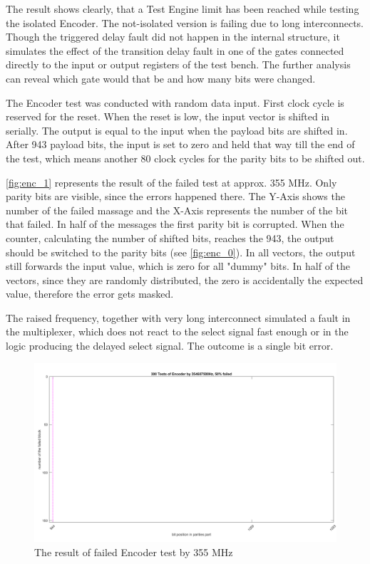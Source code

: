 The result shows clearly, that a Test Engine limit has been reached while testing the isolated Encoder. The not-isolated version is failing due to long interconnects. Though the triggered delay fault did not happen in the internal structure, 
it simulates the effect of the transition delay fault in one of the gates connected directly to the input or output registers of the test bench. The further analysis can reveal which gate would that be and how many bits were changed.

The Encoder test was conducted with random data input. First clock cycle is reserved for the reset. When the reset is low, the input vector is shifted in serially. The output is equal to the input when the payload bits are shifted in. After 943 payload bits, the input is set to zero and held that way till the end of the test, which means another 80 clock cycles for the parity bits to be shifted out. 

\autoref{fig:enc_1} represents the result of the failed test at approx. 355 MHz. Only parity bits are visible, since the errors happened there. The Y-Axis shows the number of the failed massage and the X-Axis represents the number of the bit that failed. In half of the messages the first parity bit is corrupted. When the counter, calculating the number of shifted bits, reaches the 943, the output should be switched to the parity bits (see \autoref{fig:enc_0}). In all vectors, the output still forwards the input value, which is zero for all "dummy" bits. In half of the vectors, since they are randomly distributed, the zero is accidentally the expected value, therefore the error gets masked.

The raised frequency, together with very long interconnect simulated a fault in the multiplexer, which does not react to the select signal fast enough or in the logic producing the delayed select signal. The outcome is a single bit error.

\begin{figure}[h]
\centering
\includegraphics[width=\textwidth]{figures/test_ENC_1.png}
\caption{The result of failed Encoder test by 355 MHz}
\label{fig:enc_1}
\end{figure}

